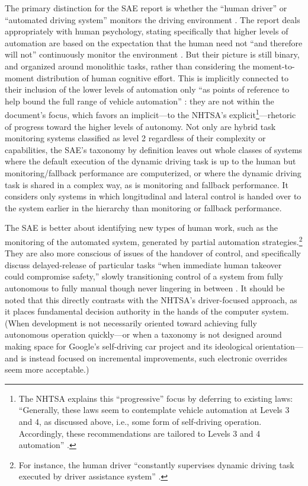 The primary distinction for the SAE report is whether the ``human driver'' or ``automated
driving system'' monitors the driving environment \cite[p. 5]{SAE}. The report deals
appropriately with human psychology, stating specifically that higher
levels of automation are based on the expectation that the human need
not ``and therefore will not'' continuously
monitor the environment \cite[p. 9]{SAE}. But their 
picture is still binary, and organized around monolithic tasks, rather
than considering the moment-to-moment 
distribution of human 
cognitive effort. This is implicitly connected to their inclusion of
the lower levels of automation only ``as points of reference to help
bound the full range of vehicle automation'' \cite[p. 2]{SAE}: they are not within
the document's focus, which favors an implicit---to the NHTSA's
explicit\footnote{The NHTSA explains this ``progressive'' focus by deferring to existing
  laws: ``Generally, these laws seem to contemplate vehicle 
automation at Levels 3 and 4, as discussed above, i.e., some form of
self-driving operation. 
Accordingly, these recommendations are tailored to Levels 3 and 4
automation'' \cite[p. 10]{NHTSA}.}---rhetoric of progress toward the
higher levels of autonomy. 
Not only are hybrid task monitoring systems classified as level 2
regardless of their complexity or capabilities, the SAE's taxonomy by
definition leaves out whole classes of systems where the default
execution of the dynamic driving task is up to the human but
monitoring/fallback performance are computerized, or where the dynamic
driving task is shared in a complex way, as is monitoring and fallback
performance. It considers only systems in which longitudinal and
lateral control is handed over to the system earlier in the hierarchy
than monitoring or fallback performance.

The SAE is better about
identifying new types of human work, such as the monitoring of the
automated system, generated by partial automation
strategies.\footnote{For instance, the human driver ``constantly
  supervises dynamic driving task executed by driver assistance
  system'' \cite[p. 3]{SAE}.} They
are also more conscious of issues of the handover of control, and
specifically discuss delayed-release of particular tasks ``when
immediate human takeover could compromise safety,'' slowly
transitioning control of a system from fully autonomous to fully
manual though never lingering in between \cite[p. 4]{SAE}. It should be
noted that this directly contrasts with the NHTSA's driver-focused
approach, as it places fundamental decision authority in the hands of
the computer system. (When development is not necessarily oriented
toward achieving fully autonomous operation quickly---or when a
taxonomy is not designed around making space for Google's self-driving
car project and its ideological orientation---and is instead
focused on incremental improvements, such electronic overrides seem more acceptable.)

